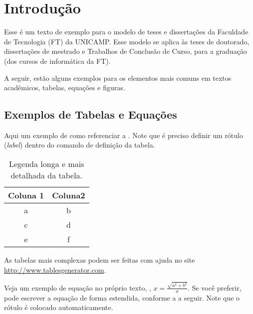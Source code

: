 \chapter{Introdução}\label{chp:Introducao}

Esse é um texto de exemplo para o modelo de teses e dissertações da Faculdade de Tecnologia (FT) da UNICAMP. Esse modelo se aplica às teses de doutorado, dissertações de mestrado e Trabalhos de Conclusão de Curso, para a graduação (dos cursos de informática da FT).

A seguir, estão alguns exemplos para os elementos mais comuns em textos acadêmicos, \ie tabelas, equações e figuras.

\section{Exemplos de Tabelas e Equações}\label{sec:exemplostabelas}
Aqui um exemplo de como referenciar a . Note que é preciso definir um rótulo (\textit{label}) dentro do comando de definição da tabela.

\begin{table}[!htp]
\caption[Legenda curta da tabela]{Legenda longa e mais detalhada da tabela.}
\label{tab:tabela_1}
\begin{center}
\begin{tabular}{cc}
\toprule %
Coluna 1 & Coluna2 \\ \midrule %
a & b \\
c & d \\
e & f \\\bottomrule %
\end{tabular}
\end{center}
\end{table}

As tabelas mais complexas podem ser feitas com ajuda no site \href{http://www.tablesgenerator.com}{http://www.tables\-ge\-ne\-ra\-tor.com}.

Veja um exemplo de equação no próprio texto, \eg, $x=\frac{\sqrt{a^{2}+b^{2}}}{\sigma}$.  Se você preferir, pode escrever a equação de forma estendida, conforme a  a seguir. Note que o rótulo é colocado automaticamente.

